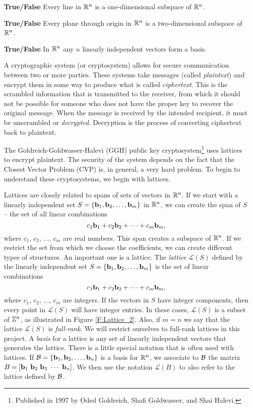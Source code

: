 \item \textbf{True/False} Every line in $\mathbb{R}^n$ is a one-dimensional subspace of $\mathbb{R}^n$.

\item \textbf{True/False} Every plane through origin in $\mathbb{R}^n$ is a two-dimensional subspace of $\mathbb{R}^n$.

\item \textbf{True/False} In $\mathbb{R}^n$ any $n$ linearly independent vectors form a basis.

\ea

\ee

\label{sec:proj_ggh_crypto}

A cryptographic system (or cryptosystem) allows for secure communication between two or more parties. These systems take messages (called \emph{plaintext}) and encrypt them in some way to produce what is called \emph{ciphertext}. This is the scrambled information that is transmitted to the receiver, from which it should not be possible for someone who does not have the proper key to recover the original message. When the message is received by the intended recipient, it must be unscrambled or \emph{decrypted}. Decryption is the process of converting ciphertext back to plaintext. 

The Goldreich-Goldwasser-Halevi (GGH) public key cryptosystem\footnote{Published in 1997 by Oded Goldreich, Shafi Goldwasser, and Shai Halevi.} uses lattices to encrypt plaintext. The security of the system depends on the fact that the Closest Vector Problem (CVP) is, in general, a very hard problem.  To begin to understand these cryptosystems, we begin with lattices. 

Lattices are closely related to spans of sets of vectors in $\mathbb{R}^n$. If we start with a linearly independent set $S = \{\mathbf{b}_1, \mathbf{b}_2, \ldots, \mathbf{b}_m\}$ in $\mathbb{R}^n$, we can create the span of $S$ -- the set of all linear combinations 
\[c_1 \mathbf{b}_1 + c_2 \mathbf{b}_2 + \cdots + c_m \mathbf{b}_m,\]
where $c_1$, $c_2$, $\ldots$, $c_m$ are real numbers. This span creates a subspace of $\mathbb{R}^n$. If we restrict the set from which we choose the coefficients, we can create different types of structures. An important one is a lattice. The \emph{lattice} $\mathcal{L}(S)$ defined by the linearly independent set $S = \{\mathbf{b}_1, \mathbf{b}_2, \ldots, \mathbf{b}_m\}$ is the set of linear combinations
\[c_1 \mathbf{b}_1 + c_2 \mathbf{b}_2 + \cdots + c_m \mathbf{b}_m,\]
where $c_1$, $c_2$, $\ldots$, $c_m$ are integers. If the vectors in $S$ have integer components, then every point in $\mathcal{L}(S)$ will have integer entries. In these cases, $\mathcal{L}(S)$ is a subset of $\mathbb{Z}^n$, as illustrated in Figure \ref{F:Lattice_2}. Also, if $m = n$ we say that the lattice $\mathcal{L}(S)$ is \emph{full-rank}. We will restrict ourselves to full-rank lattices in this project. A \emph{basis} for a lattice is any set of linearly independent vectors that generates the lattice. There is a little special notation that is often used with lattices. If $\mathcal{B} =  \{\mathbf{b}_1, \mathbf{b}_2, \ldots, \mathbf{b}_n\}$ is a basis for $\mathbb{R}^n$, we associate to $\mathcal{B}$ the matrix $B = [\mathbf{b}_1 \ \mathbf{b}_2 \ \mathbf{b}_3 \ \cdots \ \mathbf{b}_n]$. We then use the notation $\mathcal{L}(B)$ to also refer to the lattice defined by $\mathcal{B}$. 

